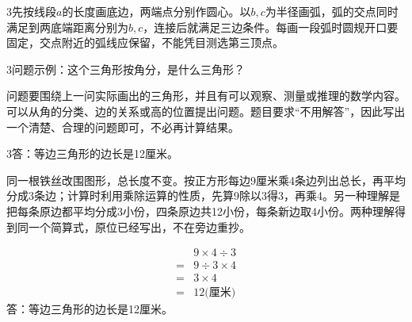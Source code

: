 \documentclass[multi=snippet,border={5bp 20bp 5bp 5bp}]{standalone}
\newenvironment{snippet}[3]{\begin{minipage}{#1bp}\color{answerred}\fontsize{#2}{#3}\selectfont\raggedright}{\end{minipage}}
\begin{document}
\begin{snippet}{505}{11.5}{14}\begin{multicols}{3}\raggedcolumns 先按线段\(a\)\allowbreak 的长度画底边，两端点分别作圆心。以\(b,\allowbreak c\)\allowbreak 为半径画弧，弧的交点同时满足到两底端距离分别为\(b,\allowbreak c\)\allowbreak ，连接后就满足三边条件。每画一段弧时圆规开口要固定，交点附近的弧线应保留，不能凭目测选第三顶点。\end{multicols}\end{snippet}
\begin{snippet}{505}{11.5}{14}\begin{multicols}{3}\raggedcolumns 问题示例：这个三角形按角分，是什么三角形？\par 问题要围绕上一问实际画出的三角形，并且有可以观察、测量或推理的数学内容。可以从角的分类、边的关系或高的位置提出问题。题目要求“不用解答”，因此写出一个清楚、合理的问题即可，不必再计算结果。\end{multicols}\end{snippet}
\begin{snippet}{505}{11.5}{14}\begin{multicols}{3}\raggedcolumns 答：等边三角形的边长是12厘米。\par 同一根铁丝改围图形，总长度不变。按正方形每边9厘米乘4条边列出总长，再平均分成3条边；计算时利用乘除运算的性质，先算9除以3得3，再乘4。另一种理解是把每条原边都平均分成3小份，四条原边共12小份，每条新边取4小份。两种理解得到同一个简算式，原位已经写出，不在旁边重抄。\end{multicols}\end{snippet}
\begin{snippet}{359}{10.5}{12.8}\SourceSans\setlength{\mathindent}{2bp}\[\begin{aligned}&9\times4\div3\\={}&9\div3\times4\\={}&3\times4\\={}&12\text{(厘米)}\end{aligned}\]答：等边三角形的边长是12厘米。\end{snippet}
\end{document}
